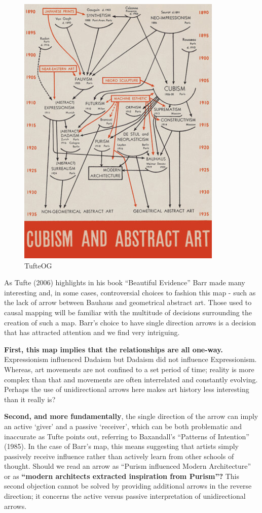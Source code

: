 \documentclass[
]{book}
\begin{document}
\begin{figure}
\centering
\includegraphics{_assets/TufteOG-16335945994571.jpg}
\caption{TufteOG}
\end{figure}

As Tufte (2006) highlights in his book ``Beautiful Evidence'' Barr made many interesting and, in some cases, controversial choices to fashion this map - such as the lack of arrow between Bauhaus and geometrical abstract art. Those used to causal mapping will be familiar with the multitude of decisions surrounding the creation of such a map. Barr's choice to have single direction arrows is a decision that has attracted attention and we find very intriguing.

\textbf{First, this map implies that the relationships are all one-way.} Expressionism influenced Dadaism but Dadaism did not influence Expressionism. Whereas, art movements are not confined to a set period of time; reality is more complex than that and movements are often interrelated and constantly evolving. Perhaps the use of unidirectional arrows here makes art history less interesting than it really is?

\textbf{Second, and more fundamentally}, the single direction of the arrow can imply an active `giver' and a passive `receiver', which can be both problematic and inaccurate as Tufte points out, referring to Baxandall's ``Patterns of Intention'' (1985). In the case of Barr's map, this means suggesting that artists simply passively receive influence rather than actively learn from other schools of thought. Should we read an arrow as ``Purism influenced Modern Architecture'' or as \textbf{``modern architects extracted inspiration from Purism''?} This second objection cannot be solved by providing additional arrows in the reverse direction; it concerns the active versus passive interpretation of unidirectional arrows.
\end{document}
